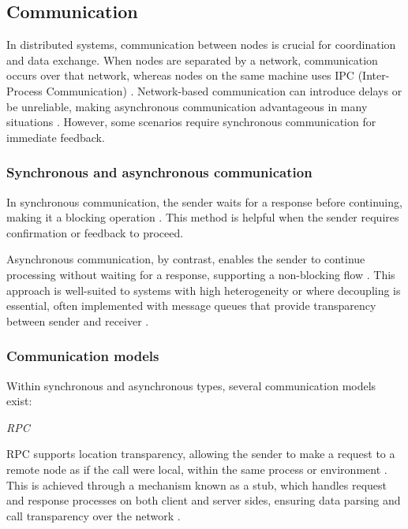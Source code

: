 \subsection{Communication}

In distributed systems, communication between nodes is crucial for coordination and data exchange. When nodes are separated by a network, communication occurs over that network, whereas nodes on the same machine uses \gls{IPC} (Inter-Process Communication) \cite{Vitillo2021}. Network-based communication can introduce delays or be unreliable, making asynchronous communication advantageous in many situations \cite{Yuan2020}. However, some scenarios require synchronous communication for immediate feedback.

\subsubsection{Synchronous and asynchronous communication}

In synchronous communication, the sender waits for a response before continuing, making it a blocking operation \cite{Tanenbaum2023, Coulouris2012}. This method is helpful when the sender requires confirmation or feedback to proceed.

Asynchronous communication, by contrast, enables the sender to continue processing without waiting for a response, supporting a non-blocking flow \cite{Tanenbaum2023, Glabbeek2008}. This approach is well-suited to systems with high heterogeneity or where decoupling is essential, often implemented with message queues that provide transparency between sender and receiver \cite{Tanenbaum2023}.

\subsubsection{Communication models}

Within synchronous and asynchronous types, several communication models exist:

\textit{\gls{RPC}}

\gls{RPC} supports location transparency, allowing the sender to make a request to a remote node as if the call were local, within the same process or environment \cite{Kleppmann2017, Coulouris2012}. This is achieved through a mechanism known as a stub, which handles request and response processes on both client and server sides, ensuring data parsing and call transparency over the network \cite{Tanenbaum2023}.

